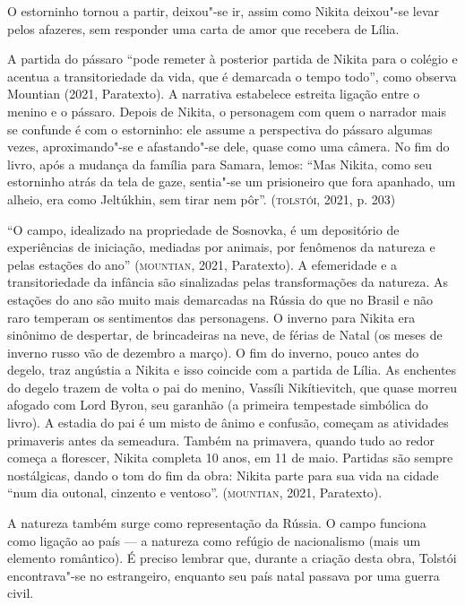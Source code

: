 \documentclass[11pt]{extarticle}
\begin{document}
\begin{enumerate}
O estorninho tornou a partir, deixou"-se ir, assim como Nikita deixou"-se
levar pelos afazeres, sem responder uma carta de amor que recebera de
Lília.

A partida do pássaro ``pode remeter à posterior partida de Nikita para o colégio e acentua a transitoriedade da vida, que é demarcada o tempo todo'', como observa
Mountian (2021, Paratexto). A narrativa estabelece estreita ligação
entre o menino e o pássaro. Depois de Nikita, o personagem com quem o
narrador mais se confunde é com o estorninho: ele assume a perspectiva
do pássaro algumas vezes, aproximando"-se e afastando"-se dele,
quase como uma câmera. No fim do livro, após a mudança da família para
Samara, lemos: ``Mas Nikita, como seu estorninho atrás da tela de gaze,
sentia"-se um prisioneiro que fora apanhado, um alheio, era como
Jeltúkhin, sem tirar nem pôr''. (\textsc{tolstói}, 2021, p. 203)

``O campo, idealizado na propriedade de Sosnovka, é um depositório de
experiências de iniciação, mediadas por animais, por fenômenos da
natureza e pelas estações do ano'' (\textsc{mountian}, 2021, Paratexto). A
efemeridade e a transitoriedade da infância são sinalizadas pelas
transformações da natureza. As estações do ano são muito mais demarcadas
na Rússia do que no Brasil e não raro temperam os sentimentos das
personagens. O inverno para Nikita era sinônimo de despertar, de
brincadeiras na neve, de férias de Natal (os meses de inverno russo vão
de dezembro a março). O fim do inverno, pouco antes do degelo, traz
angústia a Nikita e isso coincide com a partida de Lília. As enchentes
do degelo trazem de volta o pai do menino, Vassíli Nikítievitch, que
quase morreu afogado com Lord Byron, seu garanhão (a primeira tempestade
simbólica do livro). A estadia do pai é um misto de ânimo e confusão,
começam as atividades primaveris antes da semeadura. Também na
primavera, quando tudo ao redor começa a florescer, Nikita completa 10
anos, em 11 de maio. Partidas são sempre nostálgicas, dando o tom do fim
da obra: Nikita parte para sua vida na cidade ``num dia outonal,
cinzento e ventoso''. (\textsc{mountian}, 2021, Paratexto).




A natureza também surge como representação da Rússia. O campo funciona
como ligação ao país --- a natureza como refúgio de nacionalismo (mais
um elemento romântico). É preciso lembrar que, durante a criação desta
obra, Tolstói encontrava"-se no estrangeiro, enquanto seu país natal
passava por uma guerra civil.


\end{enumerate}
\end{document}
